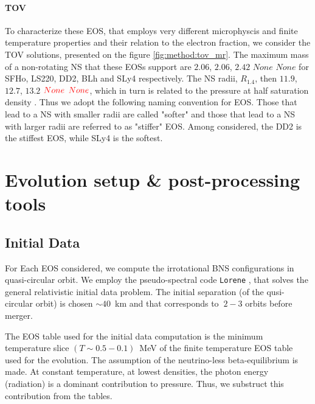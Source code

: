\documentclass[11pt,a4paper,headinclude=true,DIV=14,BCOR=8mm,chapterprefix,listof=totoc,twoside,openright,abstracton]{scrbook}
\newcommand{\red}[1]{\textcolor{red}{#1}}
\begin{document}
\subsubsection{TOV}

To characterize these EOS, that employs very different microphyscis and finite temperature properties and their relation to the electron fraction, we consider the TOV solutions, presented on the figure \ref{fig:method:tov_mr}.
The maximum mass of a non-rotating NS that these EOSs support are $2.06$, $2.06$, $2.42$ $None$ $None$ 
for SFHo, LS220, DD2, BLh and SLy4 respectively. The NS radii, $R_{1.4}$, then $11.9$, $12.7$, $13.2$ $\red{None}$ $\red{None}$, which in turn is related to the pressure at half saturation density \cite{Lattimer:2012nd}. Thus we adopt the following naming convention for EOS. Those that lead to a NS with smaller radii are called "softer" and those that lead to a NS with larger radii are referred to as "stiffer" EOS.
Among considered, the DD2 is the stiffest EOS, while SLy4 is the softest.



\chapter{Evolution setup \& post-processing tools}



\section{Initial Data}

For Each EOS considered, we compute the irrotational BNS configurations in quasi-circular orbit.
We employ the pseudo-spectral code \texttt{Lorene} \citep{Gourgoulhon:2000nn}, that 
solves the general relativistic initial data problem.
The initial separation (of the qusi-circular orbit) is chosen $\sim40$~km and that corresponds to $~2-3$ orbits before merger.

The EOS table used for the initial data computation is the minimum temperature slice
$(T\sim 0.5 - 0.1)$~MeV of the finite temperature EOS table used for the evolution.
The assumption of the neutrino-less beta-equilibrium is made.
At constant temperature, at lowest densities, the photon energy (radiation) is a dominant contribution to 
pressure. Thus, we substruct this contribution from the tables.
\end{document}
